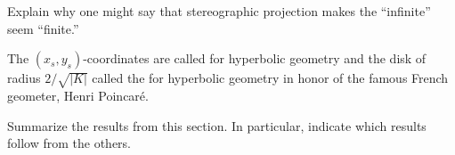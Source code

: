 \documentclass{ximera}
\begin{document}
\begin{problem}
  Explain why one might say that stereographic projection makes the
  ``infinite'' seem ``finite.''
    \begin{freeResponse}
    \end{freeResponse}
\end{problem}

The $(x_{s},y_{s})$-coordinates are called  for hyperbolic geometry and the disk of radius
$2/\sqrt{|K|}$ called the  for hyperbolic
geometry in honor of the famous French geometer, Henri Poincar\'e.









\begin{problem}
Summarize the results from this section. In particular, indicate which
results follow from the others.
\begin{freeResponse}
\end{freeResponse}
\end{problem}
\end{document}

